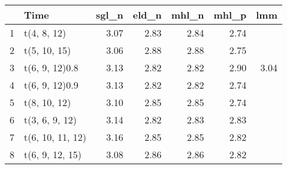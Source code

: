 \begin{table}[ht]
\centering
\begin{tabular}{rlrrrrr}
  \hline
 & Time & sgl\_n & eld\_n & mhl\_n & mhl\_p & lmm \\ 
  \hline
1 & t(4, 8, 12) & 3.07 & 2.83 & 2.84 & 2.74 &  \\ 
  2 & t(5, 10, 15) & 3.06 & 2.88 & 2.88 & 2.75 &  \\ 
  3 & t(6, 9, 12)0.8 & 3.13 & 2.82 & 2.82 & 2.90 & 3.04 \\ 
  4 & t(6, 9, 12)0.9 & 3.13 & 2.82 & 2.82 & 2.74 &  \\ 
  5 & t(8, 10, 12) & 3.10 & 2.85 & 2.85 & 2.74 &  \\ 
  6 & t(3, 6, 9, 12) & 3.14 & 2.82 & 2.83 & 2.83 &  \\ 
  7 & t(6, 10, 11, 12) & 3.16 & 2.85 & 2.85 & 2.82 &  \\ 
  8 & t(6, 9, 12, 15) & 3.08 & 2.86 & 2.86 & 2.82 &  \\ 
   \hline
\end{tabular}
\end{table}
